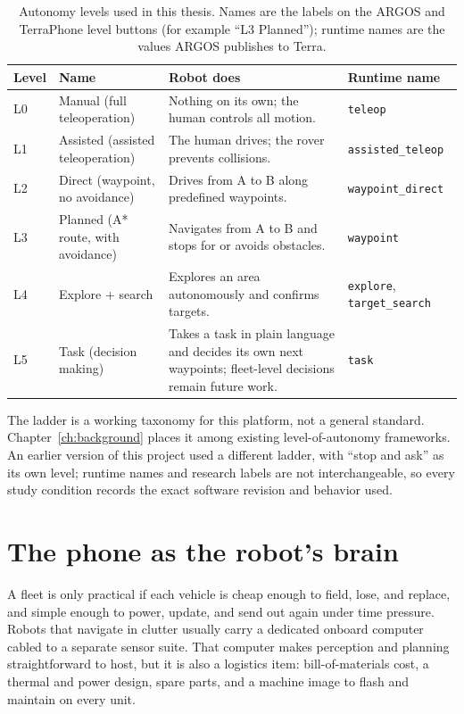 \begin{table}[ht]
\centering
\caption{Autonomy levels used in this thesis. Names are the labels on the ARGOS and TerraPhone level buttons (for example ``L3 Planned''); runtime names are the values ARGOS publishes to Terra.}
\label{tab:intro-levels}
\begin{tabularx}{\textwidth}{@{}l l X l@{}}
\toprule
Level & Name & Robot does & Runtime name \\
\midrule
L0 & Manual (full teleoperation) & Nothing on its own; the human controls all motion. & \texttt{teleop} \\
L1 & Assisted (assisted teleoperation) & The human drives; the rover prevents collisions. & \texttt{assisted\_teleop} \\
L2 & Direct (waypoint, no avoidance) & Drives from A to B along predefined waypoints. & \texttt{waypoint\_direct} \\
L3 & Planned (A* route, with avoidance) & Navigates from A to B and stops for or avoids obstacles. & \texttt{waypoint} \\
L4 & Explore + search & Explores an area autonomously and confirms targets. & \texttt{explore}, \texttt{target\_search} \\
L5 & Task (decision making) & Takes a task in plain language and decides its own next waypoints; fleet-level decisions remain future work. & \texttt{task} \\
\bottomrule
\end{tabularx}
\end{table}

The ladder is a working taxonomy for this platform, not a general standard.
Chapter~\ref{ch:background} places it among existing level-of-autonomy frameworks.
An earlier version of this project used a different ladder, with ``stop and ask'' as its own level; runtime names and research labels are not interchangeable, so every study condition records the exact software revision and behavior used.

\section*{The phone as the robot's brain}

A fleet is only practical if each vehicle is cheap enough to field, lose, and replace, and simple enough to power, update, and send out again under time pressure.
Robots that navigate in clutter usually carry a dedicated onboard computer cabled to a separate sensor suite.
That computer makes perception and planning straightforward to host, but it is also a logistics item: bill-of-materials cost, a thermal and power design, spare parts, and a machine image to flash and maintain on every unit.


